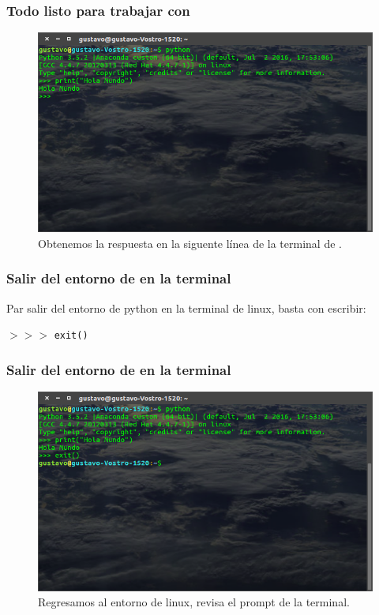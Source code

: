 \begin{frame}
\frametitle{Todo listo para trabajar con \python}
\begin{figure}
	\centering
	\includegraphics[scale=0.25]{Terminal_03}
	\caption{Obtenemos la respuesta en la siguente línea de la terminal de \python.}
\end{figure}
\end{frame}
\begin{frame}
\frametitle{Salir del entorno de \python{} en la terminal}
Par salir del entorno de python en la terminal de linux, basta con escribir:
\begin{center}
$>>>$ \texttt{exit()} \keys{\return}
\end{center}
\end{frame}
\begin{frame}
\frametitle{Salir del entorno de \python{} en la terminal}
\begin{figure}
	\centering
	\includegraphics[scale=0.25]{Terminal_04}
	\caption{Regresamos al entorno de linux, revisa el prompt de la terminal.}
\end{figure}
\end{frame}
